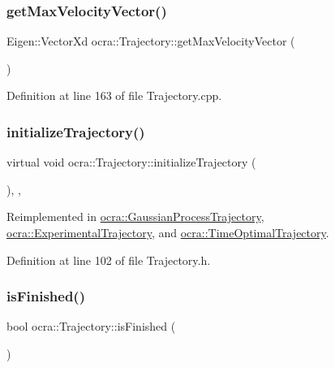 \subsubsection{\texorpdfstring{get\+Max\+Velocity\+Vector()}{getMaxVelocityVector()}}
{\footnotesize\ttfamily Eigen\+::\+Vector\+Xd ocra\+::\+Trajectory\+::get\+Max\+Velocity\+Vector (\begin{DoxyParamCaption}{ }\end{DoxyParamCaption})}



Definition at line 163 of file Trajectory.\+cpp.

\hypertarget{classocra_1_1Trajectory_aa49b123abf79be71f131c138ff2a88b2}{}\label{classocra_1_1Trajectory_aa49b123abf79be71f131c138ff2a88b2} 
\subsubsection{\texorpdfstring{initialize\+Trajectory()}{initializeTrajectory()}}
{\footnotesize\ttfamily virtual void ocra\+::\+Trajectory\+::initialize\+Trajectory (\begin{DoxyParamCaption}{ }\end{DoxyParamCaption})\hspace{0.3cm}{\ttfamily [inline]}, {\ttfamily [protected]}, {\ttfamily [virtual]}}



Reimplemented in \hyperlink{classocra_1_1GaussianProcessTrajectory_aee26ead179583530615422b05c5e2081}{ocra\+::\+Gaussian\+Process\+Trajectory}, \hyperlink{classocra_1_1ExperimentalTrajectory_a4e214517be9848835a63641578e3269d}{ocra\+::\+Experimental\+Trajectory}, and \hyperlink{classocra_1_1TimeOptimalTrajectory_a1ddd759810abea6db2462dca3aae585c}{ocra\+::\+Time\+Optimal\+Trajectory}.



Definition at line 102 of file Trajectory.\+h.

\hypertarget{classocra_1_1Trajectory_a1d6839b9239d113f6992e84a9cc711d6}{}\label{classocra_1_1Trajectory_a1d6839b9239d113f6992e84a9cc711d6} 
\subsubsection{\texorpdfstring{is\+Finished()}{isFinished()}}
{\footnotesize\ttfamily bool ocra\+::\+Trajectory\+::is\+Finished (\begin{DoxyParamCaption}{ }\end{DoxyParamCaption})\hspace{0.3cm}{\ttfamily [inline]}}



